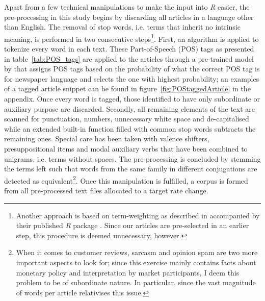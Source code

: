 Apart from a few technical manipulations to make the input into \textit{R} easier, the pre-processing in this study begins by discarding all articles in a language other than English. The removal of stop words, i.e. terms that inherit no intrinsic meaning, is performed in two consecutive steps\footnote{Another approach is based on term-weighting as described in \textcite{Silge.2017} accompanied by their published \textit{R} package \textcite{tidytextpackage}. Since our articles are pre-selected in an earlier step, this procedure is deemed unnecessary, however.}. %
First, an algorithm is applied to tokenize every word in each text. These Part-of-Speech (POS) tags as presented in table~\vref{tab:POS_tags} are applied to the articles through a pre-trained model by \textcite{OpenNLP.2016} that assigns POS tags based on the probability of what the correct POS tag is for newspaper language and selects the one with highest probability; an examples of a tagged article snippet can be found in figure~\vref{fig:POStaggedArticle} in the appendix. Once every word is tagged, those identified to have only subordinate or auxiliary purpose are discarded. Secondly, all remaining elements of the text are scanned for punctuation, numbers, unnecessary white space and de-capitalised while an extended built-in function filled with common stop words subtracts the remaining ones. Special care has been taken with valence shifters, presuppositional items and modal auxiliary verbs that have been combined to unigrams, i.e. terms without spaces. The pre-processing is concluded by stemming the terms left such that words from the same family in different conjugations are detected as equivalent\footnote{When it comes to customer reviews, sarcasm and opinion spam are two more important aspects to look for; since this exercise mainly contains facts about monetary policy and interpretation by market participants, I deem this problem to be of subordinate nature. In particular, since the vast magnitude of words per article relativises this issue.}. Once this manipulation is fulfilled, a corpus is formed from all pre-processed text files allocated to a target rate change. 


